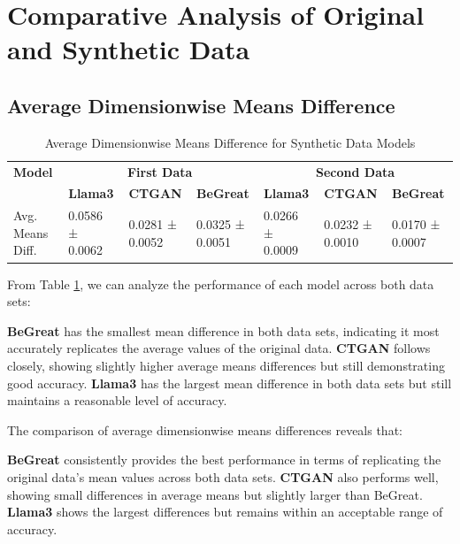 \vspace{10cm}




\section{Comparative Analysis of Original and Synthetic Data}

\subsection{Average Dimensionwise Means Difference}

\begin{table}[H]
\centering
\caption{Average Dimensionwise Means Difference for Synthetic Data Models}
\label{tab:avg_means_diff_combined}
\begin{tabularx}{\textwidth}{l*{6}{X}}
    \toprule
    \textbf{Model} & \multicolumn{3}{c}{\textbf{First Data}} & \multicolumn{3}{c}{\textbf{Second Data}} \\
    \cmidrule(lr){2-4} \cmidrule(lr){5-7}
    & \textbf{Llama3} & \textbf{CTGAN} & \textbf{BeGreat} & \textbf{Llama3} & \textbf{CTGAN} & \textbf{BeGreat} \\
    \midrule
    Avg. Means Diff. & 0.0586 ± 0.0062 & 0.0281 ± 0.0052 & 0.0325 ± 0.0051 & 0.0266 ± 0.0009 & 0.0232 ± 0.0010 & 0.0170 ± 0.0007 \\
    \bottomrule
\end{tabularx}
\end{table}



From Table \ref{tab:avg_means_diff_combined}, we can analyze the performance of each model across both data sets:

\textbf{BeGreat} has the smallest mean difference in both data sets, indicating it most accurately replicates the average values of the original data.
\textbf{CTGAN} follows closely, showing slightly higher average means differences but still demonstrating good accuracy.
\textbf{Llama3} has the largest mean difference in both data sets but still maintains a reasonable level of accuracy.

\vspace{0.5cm}


The comparison of average dimensionwise means differences reveals that:

\textbf{BeGreat} consistently provides the best performance in terms of replicating the original data's mean values across both data sets.
\textbf{CTGAN} also performs well, showing small differences in average means but slightly larger than BeGreat.
\textbf{Llama3} shows the largest differences but remains within an acceptable range of accuracy.


